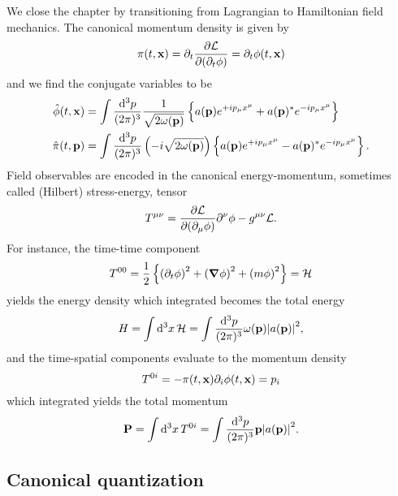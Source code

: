 We close the chapter by transitioning from Lagrangian to Hamiltonian field mechanics.
The canonical momentum density is given by
\begin{equation}
	\pi(t,\vb{x})
	=
	\partial_t\pdv{\mathcal{L}}{(\partial_t\phi)}
	=
	\partial_t\phi(t,\vb{x})
	\label{eq:canonical_momentum}
\end{equation}
and we find the conjugate variables to be
\begin{align}
	\hat\phi(t,\vb{x})
	&=
	\int\frac{\dd[3]{p}}{(2\pi)^3}
	\frac{1}{\sqrt{2\omega(\vb{p})}}
	\left\{
		a(\vb{p})
		e^{+ip_\mu x^\mu}
		+
		a(\vb{p})^*
		e^{-ip_\mu x^\mu}
	\right\}
	\label{eq:kg_pos}
	\\
	\hat\pi(t,\vb{p})
	&=
	\int\frac{\dd[3]{p}}{(2\pi)^3}
	\left(-i\sqrt{2\omega(\vb{p})}\right)
	\left\{
		a(\vb{p})
		e^{+ip_\mu x^\mu}
		-
		a(\vb{p})^*
		e^{-ip_\mu x^\mu}
	\right\}
	\label{eq:kg_mom}.
\end{align}
Field observables are encoded in the canonical energy-momentum, sometimes called (Hilbert) stress-energy, tensor
\begin{equation}
	T^{\mu\nu}
	=
	\pdv{\mathcal{L}}{(\partial_\mu\phi)}\partial^\nu\phi
	-
	g^{\mu\nu}\mathcal{L}
	\label{eq:energy_momentum_tensor}.
\end{equation}
For instance, the time-time component
\begin{equation}
	T^{00}
	=
	\frac{1}{2}
	\left\{
		\left(\partial_t\phi\right)^2
		+
		\left(\grad\phi\right)^2
		+
		\left(m\phi\right)^2
	\right\}
	=
	\mathcal{H}
	\label{eq:kg_energy_density}
\end{equation}
yields the energy density which integrated becomes the total energy
\begin{equation}
	H
	=
	\int\dd[3]{x}\mathcal{H}
	=
	\int\frac{\dd[3]{p}}{(2\pi)^3}
	\omega(\vb{p})\abs{a(\vb{p})}^2
	\label{eq:kg_total_energy},
\end{equation}
and the time-spatial components evaluate to the momentum density
\begin{equation}
	T^{0i}
	=
	-\pi(t,\vb{x})\partial_i\phi(t,\vb{x})
	=
	p_i
	\label{eq:kg_momentum_density}
\end{equation}
which integrated yields the total momentum
\begin{equation}
	\vb{P}
	=
	\int\dd[3]{x}T^{0i}
	=
	\int\frac{\dd[3]{p}}{(2\pi)^3}
	\vb{p}\abs{a(\vb{p})}^2
	\label{eq:kg_total_momentum}.
\end{equation}

\subsection{Canonical quantization}


